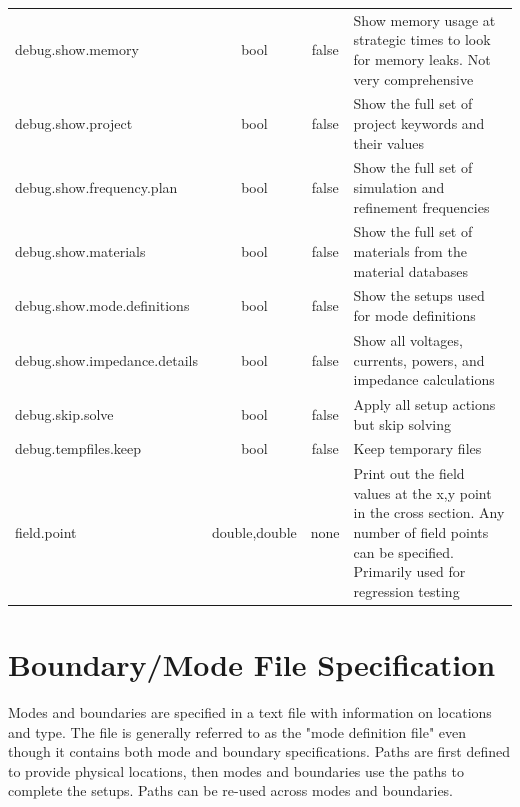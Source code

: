\documentclass[titlepage]{article}
\renewcommand\_{\textunderscore\linebreak[1]}
\begin{document}
\begin{longtable}[c]{|lccp{8cm}|}
    debug.show.memory             & bool   & false  & Show memory usage at strategic times to look for memory leaks.  Not very comprehensive \\
    debug.show.project            & bool   & false  & Show the full set of project keywords and their values \\
    debug.show.frequency.plan     & bool   & false  & Show the full set of simulation and refinement frequencies \\
    debug.show.materials          & bool   & false  & Show the full set of materials from the material databases \\
    debug.show.mode.definitions   & bool   & false  & Show the setups used for mode definitions \\
    debug.show.impedance.details  & bool   & false  & Show all voltages, currents, powers, and impedance calculations \\
    debug.skip.solve              & bool   & false  & Apply all setup actions but skip solving \\
    debug.tempfiles.keep          & bool   & false  & Keep temporary files \\
    field.point                   & double,double & none & Print out the field values at the x,y point in the cross section.  Any number of field points can be specified.  Primarily used for regression testing \\

    \hline
\end{longtable}

\newpage
\section{Boundary/Mode File Specification}
\label{sec:mode_file_spec}

Modes and boundaries are specified in a text file with information on locations and type. The file is generally referred to as the "mode definition file" even though it contains both mode and boundary specifications.  Paths are first defined to provide physical locations, then modes and boundaries use the paths to complete the setups.  Paths can be re-used across modes and boundaries.
\newline
\end{document}
